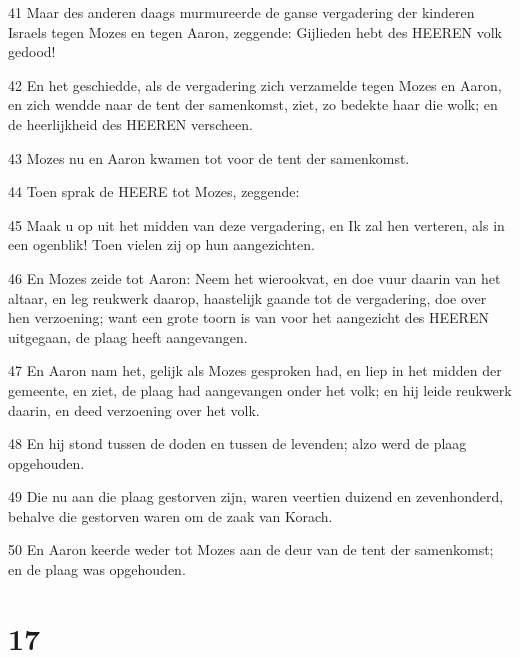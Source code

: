 \par 41 Maar des anderen daags murmureerde de ganse vergadering der kinderen Israels tegen Mozes en tegen Aaron, zeggende: Gijlieden hebt des HEEREN volk gedood!
\par 42 En het geschiedde, als de vergadering zich verzamelde tegen Mozes en Aaron, en zich wendde naar de tent der samenkomst, ziet, zo bedekte haar die wolk; en de heerlijkheid des HEEREN verscheen.
\par 43 Mozes nu en Aaron kwamen tot voor de tent der samenkomst.
\par 44 Toen sprak de HEERE tot Mozes, zeggende:
\par 45 Maak u op uit het midden van deze vergadering, en Ik zal hen verteren, als in een ogenblik! Toen vielen zij op hun aangezichten.
\par 46 En Mozes zeide tot Aaron: Neem het wierookvat, en doe vuur daarin van het altaar, en leg reukwerk daarop, haastelijk gaande tot de vergadering, doe over hen verzoening; want een grote toorn is van voor het aangezicht des HEEREN uitgegaan, de plaag heeft aangevangen.
\par 47 En Aaron nam het, gelijk als Mozes gesproken had, en liep in het midden der gemeente, en ziet, de plaag had aangevangen onder het volk; en hij leide reukwerk daarin, en deed verzoening over het volk.
\par 48 En hij stond tussen de doden en tussen de levenden; alzo werd de plaag opgehouden.
\par 49 Die nu aan die plaag gestorven zijn, waren veertien duizend en zevenhonderd, behalve die gestorven waren om de zaak van Korach.
\par 50 En Aaron keerde weder tot Mozes aan de deur van de tent der samenkomst; en de plaag was opgehouden.

\chapter{17}

